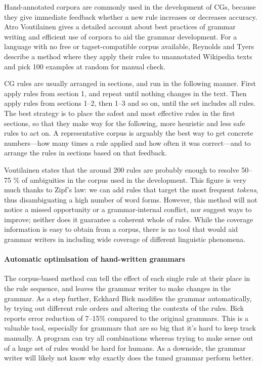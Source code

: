 Hand-annotated corpora are commonly used in the development of CGs, because they give immediate feedback whether a new rule increases or decreases accuracy.
Atro Voutilainen \cite{voutilainen2004} gives a detailed account about best practices of grammar writing and efficient use of corpora to aid the grammar development.
For a language with no free or tagset-compatible corpus available, Reynolds and Tyers \cite{tyers_reynolds2015} describe a method where they apply their rules to unannotated Wikipedia texts and pick 100 examples at random for manual check.

CG rules are usually arranged in sections, and run in the following manner. 
First apply rules from section 1, and repeat until nothing changes in the text. Then apply rules from sections 1--2, then 1--3 and so on, until the set includes all rules.
The best strategy is to place the safest and most effective rules in the first sections,
so that they make way for the following, more heuristic and less safe rules to act on.
A representative corpus is arguably the best way to get concrete numbers---how many times a rule applied and how often it was correct---and to arrange the rules in sections based on that feedback.

Voutilainen \cite{voutilainen2004} states that the around 200 rules are probably enough to resolve 50--75 \% of ambiguities in the corpus used in the development. 
This figure is very much thanks to Zipf's law: we can add rules that target the most frequent \emph{tokens}, thus disambiguating a high number of word forms.
However, this method will not notice a missed opportunity or a grammar-internal conflict, nor suggest ways to improve; neither does it guarantee a coherent whole of rules. 
While the coverage information is easy to obtain from a corpus, there is no tool that would aid grammar writers in including wide coverage of different linguistic phenomena.




\paragraph{Automatic optimisation of hand-written grammars }

The corpus-based method can tell the effect of each single rule at their place in the rule sequence, and leaves the grammar writer to make changes in the grammar.
As a step further, Eckhard Bick \cite{bick2013tuning} modifies the grammar automatically, by trying
out different rule orders and altering the contexts of the rules. 
Bick reports error reduction of 7--15\% compared to the original grammars.
This is a valuable tool, especially for grammars that are so big that it's hard to keep track manually. A program can try all combinations whereas trying to make sense out of a huge set of rules would be hard for humans.
As a downside, the grammar writer will likely not know why exactly does the tuned grammar perform better.


